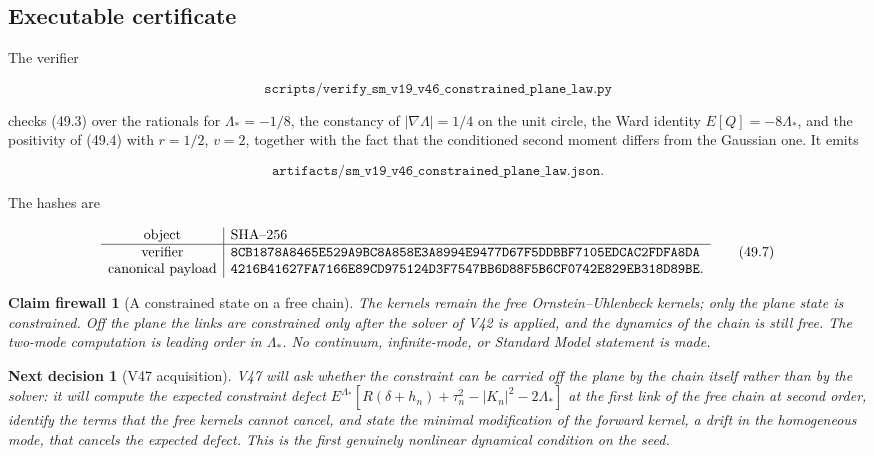 \documentclass[11pt]{article}
\newtheorem{firewall}[theorem]{Claim firewall}
\newtheorem{decision}[theorem]{Next decision}
\theoremstyle{remark}
\begin{document}
\subsection{Executable certificate}

The verifier

\[
 \texttt{scripts/verify\_sm\_v19\_v46\_constrained\_plane\_law.py}   \tag{49.5}
\]

checks (49.3) over the rationals for \(\Lambda_*=-1/8\), the constancy
of \(|\nabla\Lambda|=1/4\) on the unit circle, the Ward identity
\(E[Q]=-8\Lambda_*\), and the positivity of (49.4) with \(r=1/2\),
\(v=2\), together with the fact that the conditioned second moment
differs from the Gaussian one.  It emits

\[
 \texttt{artifacts/sm\_v19\_v46\_constrained\_plane\_law.json}.      \tag{49.6}
\]

The hashes are

\[
\begin{array}{c|l}
\hbox{object}&\hbox{SHA--256}\\ \hline
\hbox{verifier}&
\texttt{8CB1878A8465E529A9BC8A858E3A8994E9477D67F5DDBBF7105EDCAC2FDFA8DA}\\
\hbox{canonical payload}&
\texttt{4216B41627FA7166E89CD975124D3F7547BB6D88F5B6CF0742E829EB318D89BE}.
\end{array}                                                     \tag{49.7}
\]

\begin{firewall}[A constrained state on a free chain]
\label{fire:v19v46}
The kernels remain the free Ornstein--Uhlenbeck kernels; only the plane
state is constrained.  Off the plane the links are constrained only
after the solver of V42 is applied, and the dynamics of the chain is
still free.  The two-mode computation is leading order in
\(\Lambda_*\).  No continuum, infinite-mode, or Standard Model
statement is made.
\end{firewall}

\begin{decision}[V47 acquisition]
\label{dec:v19v46-next}
V47 will ask whether the constraint can be carried off the plane by
the chain itself rather than by the solver: it will compute the
expected constraint defect
\(E^{\Lambda_*}[R(\delta+h_n)+\tau_n^2-|K_n|^2-2\Lambda_*]\) at the first
link of the free chain at second order, identify the terms that the
free kernels cannot cancel, and state the minimal modification of the
forward kernel, a drift in the homogeneous mode, that cancels the
expected defect.  This is the first genuinely nonlinear dynamical
condition on the seed.
\end{decision}
\end{document}
